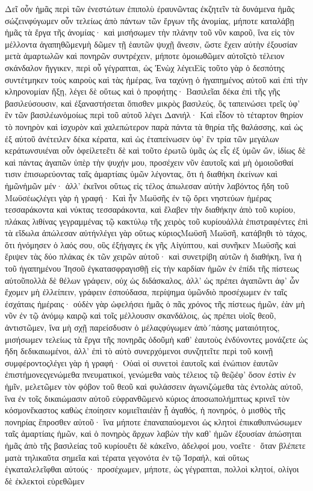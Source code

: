 Δεῖ οὖν ἡμᾶς περὶ τῶν ἐνεστώτων ἐπιπολὺ ἐραυνῶντας ἐκζητεῖν τὰ δυνάμενα ἡμᾶς σώζεινφύγωμεν οὖν τελείως ἀπὸ πάντων τῶν ἔργων τῆς ἀνομίας, μήποτε καταλάβῃ ἡμᾶς τὰ ἔργα τῆς ἀνομίας· καὶ μισήσωμεν τὴν πλάνην τοῦ νῦν καιροῦ, ἵνα εἰς τὸν μέλλοντα ἀγαπηθῶμενμὴ δῶμεν τῇ ἑαυτῶν ψυχῇ ἄνεσιν, ὥστε ἔχειν αὐτὴν ἐξουσίαν μετὰ ἁμαρτωλῶν καὶ πονηρῶν συντρέχειν, μήποτε ὁμοιωθῶμεν αὐτοῖςτὸ τέλειον σκάνδαλον ἤγγικεν, περὶ οὗ γέγραπται, ὡς Ἐνὼχ λέγειΕἰς τοῦτο γὰρ ὁ δεσπότης συντέτμηκεν τοὺς καιροὺς καὶ τὰς ἡμέρας, ἵνα ταχύνῃ ὁ ἠγαπημένος αὐτοῦ καὶ ἐπὶ τὴν κληρονομίαν ἥξῃ, λέγει δὲ οὕτως καὶ ὁ προφήτης· Βασιλεῖαι δέκα ἐπὶ τῆς γῆς βασιλεύσουσιν, καὶ ἐξαναστήσεται ὄπισθεν μικρὸς βασιλεύς, ὃς ταπεινώσει τρεῖς ὑφ’ ἓν τῶν βασιλέωνὁμοίως περὶ τοῦ αὐτοῦ λέγει Δανιήλ· Καὶ εἶδον τὸ τέταρτον θηρίον τὸ πονηρὸν καὶ ἰσχυρὸν καὶ χαλεπώτερον παρὰ πάντα τὰ θηρία τῆς θαλάσσης, καὶ ὡς ἐξ αὐτοῦ ἀνέτειλεν δέκα κέρατα, καὶ ὡς ἐταπείνωσεν ὑφ’ ἓν τρία τῶν μεγάλων κεράτωνσυιέναι οὖν ὀφείλετεἔτι δὲ καὶ τοῦτο ἐρωτῶ ὑμᾶς ὡς εἷς ἐξ ὑμῶν ὤν, ἰδίως δὲ καὶ πάντας ἀγαπῶν ὑπὲρ τὴν ψυχήν μου, προσέχειν νῦν ἑαυτοῖς καὶ μὴ ὁμοιοῦσθαί τισιν ἐπισωρεύοντας ταῖς ἁμαρτίαις ὑμῶν λέγοντας, ὅτι ἡ διαθήκη ἐκείνων καὶ ἡμῶνἡμῶν μέν· ἀλλ’ ἐκεῖνοι οὕτως εἰς τέλος ἀπωλεσαν αὐτὴν λαβόντος ἤδη τοῦ Μωϋσέωςλέγει γὰρ ἡ γραφή· Καὶ ἦν Μωϋσῆς ἐν τῷ ὄρει νηστεύων ἡμέρας τεσσαράκοντα καὶ νύκτας τεσσαράκοντα, καὶ ἔλαβεν τὴν διαθήκην ἀπὸ τοῦ κυρίου, πλάκας λιθίνας γεγραμμένας τῷ κακτύλῳ τῆς χειρὸς τοῦ κυρίουἀλλὰ ἐπιστραφέντες ἐπὶ τὰ εἴδωλα ἀπώλεσαν αὐτήνλέγει γὰρ οὕτως κύριοςΜωϋσῆ Μωϋσῆ, κατάβηθι τὸ τάχος, ὅτι ἠνόμησεν ὁ λαός σου, οὓς ἐξήγαγες ἐκ γῆς Αἰγύπτου, καὶ συνῆκεν Μωϋσῆς καὶ ἔριψεν τὰς δύο πλάκας ἐκ τῶν χειρῶν αὐτοῦ· καὶ συνετρίβη αὐτῶν ἡ διαθήκη, ἵνα ἡ τοῦ ἠγαπημένου Ἰησοῦ ἐγκατασφραγισθῇ εἰς τὴν καρδίαν ἡμῶν ἐν ἐπίδι τῆς πίστεως αὐτοῦπολλὰ δὲ θέλων γράφειν, οὐχ ὡς διδάσκαλος, ἀλλ’ ὡς πρέπει ἀγαπῶντι ἀφ’ ὧν ἔχομεν μὴ ἐλλείπειν, γράφειν ἐσπούδασα, περίψημα ὑμῶνδιὸ προσέχωμεν ἐν ταῖς ἐσχάταις ἡμέραις· οὐδὲν γὰρ ὠφελήσει ἡμᾶς ὁ πᾶς χρόνος τῆς πίστεως ἡμῶν, ἐὰν μὴ νῦν ἐν τῷ ἀνόμῳ καιρῷ καὶ τοῖς μέλλουσιν σκανδάλοις, ὡς πρέπει υἱοῖς θεοῦ, ἀντιστῶμεν, ἵνα μὴ σχῇ παρείσδυσιν ὁ μέλαςφύγωμεν ἀπὸ´πάσης ματαιότητος, μισήσωμεν τελείως τὰ ἔργα τῆς πονηρᾶς ὁδοῦμὴ καθ’ ἑαυτοὺς ἐνδύνοντες μονάζετε ὡς ἤδη δεδικαιωμένοι, ἀλλ’ ἐπὶ τὸ αὐτὸ συνερχόμενοι συνζητεῖτε περὶ τοῦ κοινῇ συμφέροντοςλέγει γὰρ ἡ γραφή· Οὐαὶ οἱ συνετοὶ ἑαυτοῖς καὶ ἐνώπιον ἑαυτῶν ἐπιστήμονεςγενώμεθα πνευματικοί, γενώμεθα ναὸς τέλειος τῷ θεῷἐφ’ ὅσον ἐστὶν ἐν ἡμῖν, μελετῶμεν τὸν φόβον τοῦ θεοῦ καὶ φυλάσσειν ἀγωνιζώμεθα τὰς ἐντολὰς αὐτοῦ, ἵνα ἐν τοῖς δικαιώμασιν αὐτοῦ εὐφρανθῶμενὁ κύριος ἀποσωπολήμπτως κρινεῖ τὸν κόσμονἕκαστος καθὼς ἐποίησεν κομιεῖταιἐὰν ᾖ ἀγαθός, ἡ πονηρός, ὁ μισθὸς τῆς πονηρίας ἔπροσθεν αὐτοῦ· ἵνα μήποτε ἐπαναπαύομενοι ὡς κλητοὶ ἐπικαθυπνώσωμεν ταῖς ἁμαρτίαις ἡμῶν, καὶ ὁ πονηρὸς ἄρχων λαβὼν τὴν καθ’ ἡμῶν ἐξουσίαν ἀπώσηται ἡμᾶς ἀπὸ τῆς βασιλείας τοῦ κυρίουἔτι δὲ κἀκεῖνο, ἀδελφοί μου, νοεῖτε· ὅταν βλέπετε ματὰ τηλικαῦτα σημεῖα καὶ τέρατα γεγονότα ἐν τῷ Ἰσραήλ, καὶ οὕτως ἐγκαταλελεῖφθαι αὐτούς· προσέχωμεν, μήποτε, ὡς γέγραπται, πολλοὶ κλητοί, ολίγοι δὲ ἐκλεκτοὶ εὑρεθῶμεν
